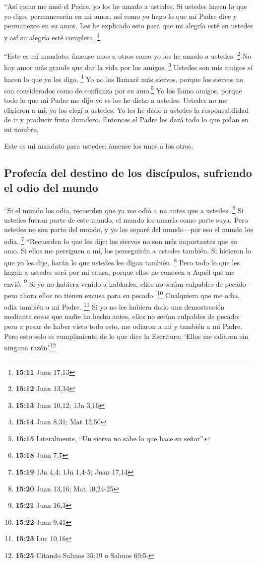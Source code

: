  ``Así como me amó el Padre, yo los he amado a ustedes.
 Si ustedes hacen lo que yo digo, permanecerán en mi
amor, así como yo hago lo que mi Padre dice y permanezco en su amor.
 Les he explicado esto para que mi alegría esté en
ustedes y así su alegría esté completa. \footnote{\textbf{15:11} Juan
  17,13}

 ``Este es mi mandato: ámense unos a otros como yo los he
amado a ustedes. \footnote{\textbf{15:12} Juan 13,34}  No
hay amor más grande que dar la vida por los amigos. \footnote{\textbf{15:13}
  Juan 10,12; 1Jn 3,16}  Ustedes son mis amigos si hacen
lo que yo les digo. \footnote{\textbf{15:14} Juan 8,31; Mat 12,50}
 Yo no los llamaré más siervos, porque los siervos no son
considerados como de confianza por su amo.\footnote{\textbf{15:15}
  Literalmente, ``Un siervo no sabe lo que hace su señor''.} Yo los
llamo amigos, porque todo lo que mi Padre me dijo yo se los he dicho a
ustedes.  Ustedes no me eligieron a mí, yo los elegí a
ustedes. Yo les he dado a ustedes la responsabilidad de ir y producir
fruto duradero. Entonces el Padre les dará todo lo que pidan en mi
nombre.

 Este es mi mandato para ustedes: ámense los unos a los
otros.

\hypertarget{profecuxeda-del-destino-de-los-discuxedpulos-sufriendo-el-odio-del-mundo}{%
\subsection{Profecía del destino de los discípulos, sufriendo el odio
del
mundo}\label{profecuxeda-del-destino-de-los-discuxedpulos-sufriendo-el-odio-del-mundo}}

 ``Si el mundo los odia, recuerden que ya me odió a mi
antes que a ustedes. \footnote{\textbf{15:18} Juan 7,7} 
Si ustedes fueran parte de este mundo, el mundo los amaría como parte
suya. Pero ustedes no son parte del mundo, y yo los separé del
mundo---por eso el mundo los odia. \footnote{\textbf{15:19} 1Jn 4,4; 1Jn
  1,4-5; Juan 17,14}  ``Recuerden lo que les dije: los
siervos no son más importantes que su amo. Si ellos me persiguen a mí,
los perseguirán a ustedes también. Si hicieron lo que yo les dije, harán
lo que ustedes les digan también. \footnote{\textbf{15:20} Juan 13,16;
  Mat 10,24-25}  Pero todo lo que les hagan a ustedes
será por mi causa, porque ellos no conocen a Aquél que me envió.
\footnote{\textbf{15:21} Juan 16,3}  Si yo no hubiera
venido a hablarles, ellos no serían culpables de pecado---pero ahora
ellos no tienen excusa para su pecado. \footnote{\textbf{15:22} Juan
  9,41}  Cualquiera que me odia, odia también a mi Padre.
\footnote{\textbf{15:23} Luc 10,16}  Si yo no les hubiera
dado una demostración mediante cosas que nadie ha hecho antes, ellos no
serían culpables de pecado; pero a pesar de haber visto todo esto, me
odiaron a mí y también a mi Padre.  Pero esto solo es
cumplimiento de lo que dice la Escritura: `Ellos me odiaron sin ninguna
razón'.\footnote{\textbf{15:25} Citando Salmos 35:19 o Salmos 69:5.}

